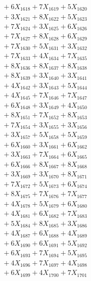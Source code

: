 \documentclass[a4paper,10pt]{article}
\begin{document}
{\begin{align}
&\;  + 6 X_{1618} + 7 X_{1619} + 5 X_{1620} \\[0.3ex]
&\;  + 3 X_{1621} + 8 X_{1622} + 5 X_{1623} \\[0.3ex]
&\;  + 7 X_{1624} + 3 X_{1625} + 6 X_{1626} \\[0.3ex]
&\;  + 7 X_{1627} + 8 X_{1628} + 6 X_{1629} \\[0.5ex]\allowbreak
&\;  + 7 X_{1630} + 5 X_{1631} + 3 X_{1632} \\[0.3ex]
&\;  + 7 X_{1633} + 4 X_{1634} + 7 X_{1635} \\[0.3ex]
&\;  + 8 X_{1636} + 8 X_{1637} + 8 X_{1638} \\[0.3ex]
&\;  + 8 X_{1639} + 3 X_{1640} + 3 X_{1641} \\[0.3ex]
&\;  + 4 X_{1642} + 3 X_{1643} + 5 X_{1644} \\[0.3ex]
&\;  + 4 X_{1645} + 7 X_{1646} + 7 X_{1647} \\[0.3ex]
&\;  + 6 X_{1648} + 3 X_{1649} + 4 X_{1650} \\[0.3ex]
&\;  + 8 X_{1651} + 7 X_{1652} + 8 X_{1653} \\[0.3ex]
&\;  + 7 X_{1654} + 3 X_{1655} + 3 X_{1656} \\[0.3ex]
&\;  + 3 X_{1657} + 5 X_{1658} + 5 X_{1659} \\[0.5ex]\allowbreak
&\;  + 6 X_{1660} + 3 X_{1661} + 6 X_{1662} \\[0.3ex]
&\;  + 3 X_{1663} + 7 X_{1664} + 6 X_{1665} \\[0.3ex]
&\;  + 6 X_{1666} + 8 X_{1667} + 8 X_{1668} \\[0.3ex]
&\;  + 3 X_{1669} + 3 X_{1670} + 8 X_{1671} \\[0.3ex]
&\;  + 7 X_{1672} + 5 X_{1673} + 6 X_{1674} \\[0.3ex]
&\;  + 8 X_{1675} + 7 X_{1676} + 7 X_{1677} \\[0.3ex]
&\;  + 4 X_{1678} + 5 X_{1679} + 6 X_{1680} \\[0.3ex]
&\;  + 4 X_{1681} + 6 X_{1682} + 7 X_{1683} \\[0.3ex]
&\;  + 5 X_{1684} + 8 X_{1685} + 3 X_{1686} \\[0.3ex]
&\;  + 4 X_{1687} + 6 X_{1688} + 4 X_{1689} \\[0.5ex]\allowbreak
&\;  + 6 X_{1690} + 6 X_{1691} + 5 X_{1692} \\[0.3ex]
&\;  + 6 X_{1693} + 7 X_{1694} + 5 X_{1695} \\[0.3ex]
&\;  + 4 X_{1696} + 7 X_{1697} + 4 X_{1698} \\[0.3ex]
&\;  + 6 X_{1699} + 4 X_{1700} + 7 X_{1701} \\[0.3ex]

\end{align}}
\end{document}
